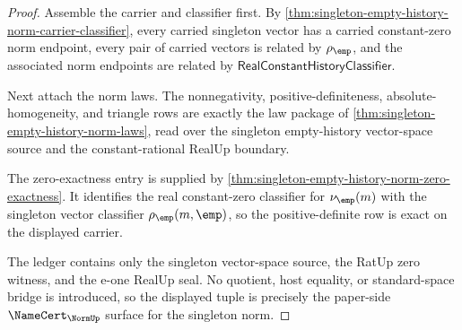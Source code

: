 \begin{proof}
Assemble the carrier and classifier first. By
\autoref{thm:singleton-empty-history-norm-carrier-classifier}, every carried
singleton vector has a carried constant-zero norm endpoint, every pair of
carried vectors is related by $\rho_{\emp}$, and the associated norm endpoints
are related by $\mathsf{RealConstantHistoryClassifier}$.

Next attach the norm laws. The nonnegativity, positive-definiteness,
absolute-homogeneity, and triangle rows are exactly the law package of
\autoref{thm:singleton-empty-history-norm-laws}, read over the singleton
empty-history vector-space source and the constant-rational RealUp boundary.

The zero-exactness entry is supplied by
\autoref{thm:singleton-empty-history-norm-zero-exactness}. It identifies the
real constant-zero classifier for $\nu_{\emp}(m)$ with the singleton vector
classifier $\rho_{\emp}(m,\emp)$, so the positive-definite row is exact on the
displayed carrier.

The ledger contains only the singleton vector-space source, the RatUp zero
witness, and the e-one RealUp seal. No quotient, host equality, or
standard-space bridge is introduced, so the displayed tuple is precisely the
paper-side $\NameCert_{\NormUp}$ surface for the singleton norm.
\end{proof}

